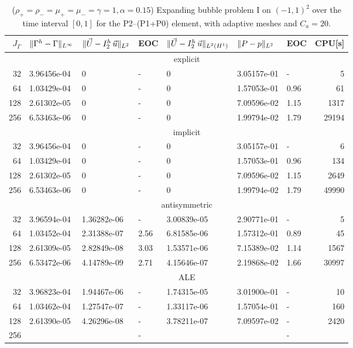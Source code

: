 \begin{table}
\center
\hspace*{-3.25cm}
\begin{tabular}{rllllllr}
\hline
$J_\Gamma$ & $\|\Gamma^h - \Gamma\|_{L^\infty}$ & $\|\vec U - I^h_{2}\,\vec u\|_{L^2}$ & EOC & $\|\vec U - I^h_{2}\,\vec u\|_{L^2(H^1)}$ & $\|P - p\|_{L^2}$ & EOC
& CPU[s] \\
\hline
& \multicolumn{7}{c}{explicit} \\
\hline
 32 & 3.96456e-04 & 0 & - & 0 & 3.05157e-01 &    - &     5 \\
 64 & 1.03429e-04 & 0 & - & 0 & 1.57053e-01 & 0.96 &    61 \\
128 & 2.61302e-05 & 0 & - & 0 & 7.09596e-02 & 1.15 &  1317 \\
256 & 6.53463e-06 & 0 & - & 0 & 1.99794e-02 & 1.79 & 29194 \\
\hline
& \multicolumn{7}{c}{implicit} \\
\hline
 32 & 3.96456e-04 & 0 & - & 0 & 3.05157e-01 &    - &     6 \\
 64 & 1.03429e-04 & 0 & - & 0 & 1.57053e-01 & 0.96 &   134 \\
128 & 2.61302e-05 & 0 & - & 0 & 7.09596e-02 & 1.15 &  2649 \\
256 & 6.53463e-06 & 0 & - & 0 & 1.99794e-02 & 1.79 & 49990 \\
\hline
& \multicolumn{7}{c}{antisymmetric} \\
\hline
 32 & 3.96594e-04 & 1.36282e-06 &    - & 3.00839e-05 & 2.90771e-01 &    - &
5 \\
 64 & 1.03452e-04 & 2.31388e-07 & 2.56 & 6.81585e-06 & 1.57312e-01 & 0.89 &
45 \\
128 & 2.61309e-05 & 2.82849e-08 & 3.03 & 1.53571e-06 & 7.15389e-02 & 1.14 &
1567 \\
256 & 6.53472e-06 & 4.14789e-09 & 2.71 & 4.15646e-07 & 2.19868e-02 & 1.66 &
30997 \\
\hline
& \multicolumn{7}{c}{ALE} \\
\hline
 32 & 3.96823e-04 & 1.94467e-06 & - & 1.74315e-05 & 3.01900e-01 & - &   10 \\
 64 & 1.03462e-04 & 1.27547e-07 & - & 1.33117e-06 & 1.57054e-01 & - &  160 \\
128 & 2.61390e-05 & 4.26296e-08 & - & 3.78211e-07 & 7.09597e-02 & - & 2420 \\
256 & & & - & & & - & \\
\hline
\end{tabular}
\hspace*{-3.25cm}
\caption[Navier--Stokes expanding bubble I errors P2--(P1+P0)]
{($\rho_+ = \rho_- = \mu_+ = \mu_- = \gamma = 1,\alpha=0.15$)
Expanding bubble problem I on $(-1,1)^2$ over the time interval $[0,1]$ for the
P2--(P1+P0) element, with adaptive meshes and $C_a=20$\textdegree.}
\label{tab:nsexpandingbubbleIp2p1p0}
\end{table}

